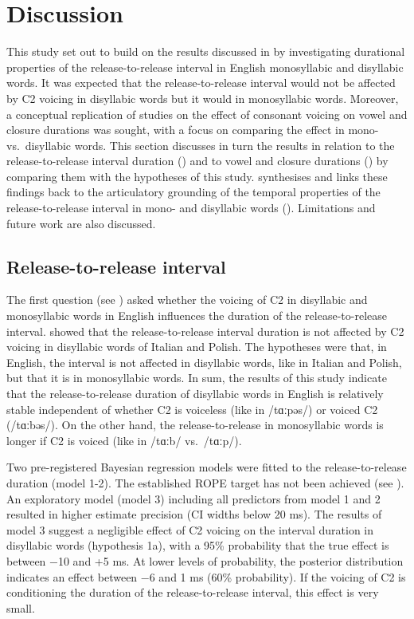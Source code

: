 \documentclass[
  12pt,
  a4paper,
  authoryear, 5p]{elsarticle}
\begin{document}
\hypertarget{discussion}{%
\section{Discussion}\label{discussion}}

This study set out to build on the results discussed in
\citet{coretta2018j} by investigating durational properties of the
release-to-release interval in English monosyllabic and disyllabic
words. It was expected that the release-to-release interval would not be
affected by C2 voicing in disyllabic words but it would in monosyllabic
words. Moreover, a conceptual replication of studies on the effect of
consonant voicing on vowel and closure durations was sought, with a
focus on comparing the effect in mono- vs.~disyllabic words. This
section discusses in turn the results in relation to the
release-to-release interval duration () and to vowel and
closure durations () by comparing them with the
hypotheses of this study.  synthesises and links these
findings back to the articulatory grounding of the temporal properties
of the release-to-release interval in mono- and disyllabic words
(). Limitations and future work are also discussed.

\hypertarget{release-to-release-interval}{%
\subsection{Release-to-release
interval}\label{release-to-release-interval}}

\label{s:rr-disc}

The first question (see ) asked whether the voicing of C2
in disyllabic and monosyllabic words in English influences the duration
of the release-to-release interval. \citet{coretta2018j} showed that the
release-to-release interval duration is not affected by C2 voicing in
disyllabic words of Italian and Polish. The hypotheses were that, in
English, the interval is not affected in disyllabic words, like in
Italian and Polish, but that it is in monosyllabic words. In sum, the
results of this study indicate that the release-to-release duration of
disyllabic words in English is relatively stable independent of whether
C2 is voiceless (like in /tɑːpəs/) or voiced C2 (/tɑːbəs/). On the other
hand, the release-to-release in monosyllabic words is longer if C2 is
voiced (like in /tɑːb/ vs.~/tɑːp/).

Two pre-registered Bayesian regression models were fitted to the
release-to-release duration (model 1-2). The established ROPE target has
not been achieved (see ). An exploratory model
(model 3) including all predictors from model 1 and 2 resulted in higher
estimate precision (CI widths below 20 ms). The results of model 3
suggest a negligible effect of C2 voicing on the interval duration in
disyllabic words (hypothesis 1a), with a 95\% probability that the true
effect is between −10 and +5 ms. At lower levels of probability, the
posterior distribution indicates an effect between −6 and 1 ms (60\%
probability). If the voicing of C2 is conditioning the duration of the
release-to-release interval, this effect is very small.
\end{document}
